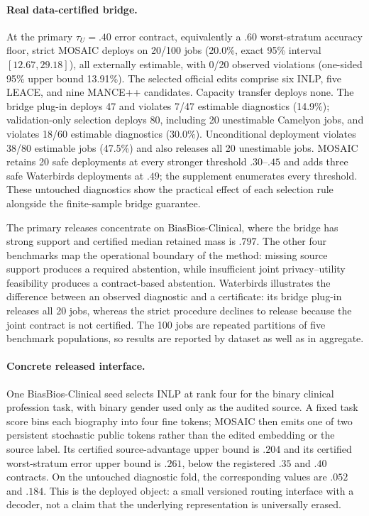 \paragraph{Real data-certified bridge.}
At the primary $\tau_U=.40$ error contract, equivalently a $.60$
worst-stratum accuracy floor, strict MOSAIC deploys on 20/100 jobs
(20.0\%, exact 95\% interval $[12.67,29.18]$), all externally estimable, with
0/20 observed violations (one-sided 95\% upper bound 13.91\%). The selected
official edits comprise six INLP, five LEACE, and nine MANCE++ candidates.
Capacity transfer deploys none. The bridge plug-in deploys 47 and violates
7/47 estimable diagnostics (14.9\%); validation-only selection deploys 80,
including 20 unestimable Camelyon jobs, and violates 18/60 estimable
diagnostics (30.0\%). Unconditional deployment violates 38/80 estimable jobs
(47.5\%) and also releases all 20 unestimable jobs. MOSAIC retains 20 safe
deployments at every stronger threshold $.30$--$.45$ and adds three safe
Waterbirds deployments at $.49$; the supplement enumerates every threshold.
These untouched diagnostics show the practical effect of each selection rule
alongside the finite-sample bridge guarantee.

The primary releases concentrate on BiasBios-Clinical, where the bridge has
strong support and certified median retained mass is $.797$. The other four
benchmarks map the operational boundary of the method: missing source support
produces a required abstention, while insufficient joint privacy--utility
feasibility produces a contract-based abstention. Waterbirds illustrates the
difference between an observed diagnostic and a certificate: its bridge plug-in
releases all 20 jobs, whereas the strict procedure declines to release because
the joint contract is not certified. The 100 jobs are repeated partitions of
five benchmark populations, so results are reported by dataset as well as in
aggregate.

\paragraph{Concrete released interface.}
One BiasBios-Clinical seed selects INLP at rank four for the binary clinical
profession task, with binary gender used only as the audited source. A fixed
task score bins each biography into four fine tokens; MOSAIC then emits one of
two persistent stochastic public tokens rather than the edited embedding or the
source label. Its certified source-advantage upper bound is $.204$ and its
certified worst-stratum error upper bound is $.261$, below the registered $.35$
and $.40$ contracts. On the untouched diagnostic fold, the corresponding values
are $.052$ and $.184$. This is the deployed object: a small versioned routing
interface with a decoder, not a claim that the underlying representation is
universally erased.

